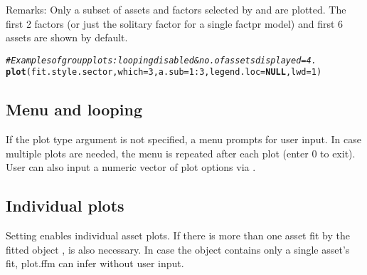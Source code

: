 \documentclass[a4paper]{article}\usepackage[]{graphicx}\usepackage[]{color}
\makeatletter
\newcommand{\hlnum}[1]{\textcolor[rgb]{0.686,0.059,0.569}{#1}}%
\newcommand{\hlcom}[1]{\textcolor[rgb]{0.678,0.584,0.686}{\textit{#1}}}%
\newcommand{\hlopt}[1]{\textcolor[rgb]{0,0,0}{#1}}%
\newcommand{\hlstd}[1]{\textcolor[rgb]{0.345,0.345,0.345}{#1}}%
\newcommand{\hlkwa}[1]{\textcolor[rgb]{0.161,0.373,0.58}{\textbf{#1}}}%
\newcommand{\hlkwc}[1]{\textcolor[rgb]{0.333,0.667,0.333}{#1}}%
\newcommand{\hlkwd}[1]{\textcolor[rgb]{0.737,0.353,0.396}{\textbf{#1}}}%
\newenvironment{kframe}{%
 \def\at@end@of@kframe{}%
 \ifinner\ifhmode%
  \def\at@end@of@kframe{\end{minipage}}%
  \begin{minipage}{\columnwidth}%
 \fi\fi%
 \def\FrameCommand##1{\hskip\@totalleftmargin \hskip-\fboxsep
 \colorbox{shadecolor}{##1}\hskip-\fboxsep
     \hskip-\linewidth \hskip-\@totalleftmargin \hskip\columnwidth}%
 \MakeFramed {\advance\hsize-\width
   \@totalleftmargin\z@ \linewidth\hsize
   \@setminipage}}%
 {\par\unskip\endMakeFramed%
 \at@end@of@kframe}
\newenvironment{knitrout}{}{} %
\makeatother
\begin{document}
Remarks: Only a subset of assets and factors selected by  and  are plotted. The first 2 factors (or just the solitary factor for a single factpr model) and first 6 assets are shown by default.

\begin{knitrout}
\color{fgcolor}\begin{kframe}
\begin{alltt}
\hlcom{# Examples of group plots: looping disabled & no. of assets displayed = 4.}
\hlkwd{plot}\hlstd{(fit.style.sector,} \hlkwc{which}\hlstd{=}\hlnum{3}\hlstd{,} \hlkwc{a.sub}\hlstd{=}\hlnum{1}\hlopt{:}\hlnum{3}\hlstd{,} \hlkwc{legend.loc}\hlstd{=}\hlkwa{NULL}\hlstd{,} \hlkwc{lwd}\hlstd{=}\hlnum{1}\hlstd{)}
\end{alltt}


{\ttfamily\noindent\bfseries\color{errorcolor}{\#\# Error in xy.coords(x, y, xlabel, ylabel, log): 'x' is a list, but does not have components 'x' and 'y'}}\end{kframe}
\end{knitrout}

\subsection{Menu and looping}

If the plot type argument  is not specified, a menu prompts for user input. In case multiple plots are needed, the menu is repeated after each plot (enter 0 to exit). User can also input a numeric vector of plot options via .

\newpage
\subsection{Individual plots}

Setting  enables individual asset plots. If there is more than one asset fit by the fitted object ,  is also necessary. In case the  object  contains only a single asset's fit, plot.ffm can infer  without user input.
\end{document}
